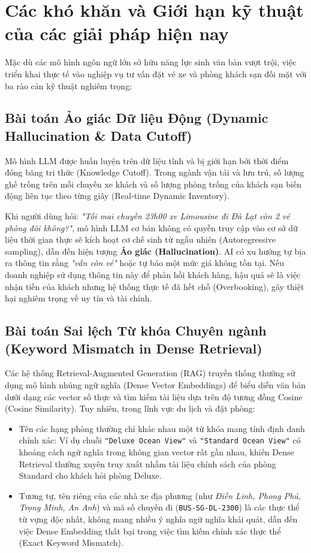 \section{Các khó khăn và Giới hạn kỹ thuật của các giải pháp hiện nay}

Mặc dù các mô hình ngôn ngữ lớn sở hữu năng lực sinh văn bản vượt trội, việc triển khai thực tế vào nghiệp vụ tư vấn đặt vé xe và phòng khách sạn đối mặt với ba rào cản kỹ thuật nghiêm trọng:

\subsection{Bài toán Ảo giác Dữ liệu Động (Dynamic Hallucination \& Data Cutoff)}
Mô hình LLM được huấn luyện trên dữ liệu tĩnh và bị giới hạn bởi thời điểm đóng băng tri thức (Knowledge Cutoff). Trong ngành vận tải và lưu trú, số lượng ghế trống trên mỗi chuyến xe khách và số lượng phòng trống của khách sạn biến động liên tục theo từng giây (Real-time Dynamic Inventory). 

Khi người dùng hỏi: \textit{"Tối mai chuyến 23h00 xe Limousine đi Đà Lạt còn 2 vé phòng đôi không?"}, mô hình LLM cơ bản không có quyền truy cập vào cơ sở dữ liệu thời gian thực sẽ kích hoạt cơ chế sinh từ ngẫu nhiên (Autoregressive sampling), dẫn đến hiện tượng \textbf{Ảo giác (Hallucination)}. AI có xu hướng tự bịa ra thông tin rằng \textit{"vẫn còn vé"} hoặc tự báo một mức giá không tồn tại. Nếu doanh nghiệp sử dụng thông tin này để phản hồi khách hàng, hậu quả sẽ là việc nhận tiền của khách nhưng hệ thống thực tế đã hết chỗ (Overbooking), gây thiệt hại nghiêm trọng về uy tín và tài chính.

\subsection{Bài toán Sai lệch Từ khóa Chuyên ngành (Keyword Mismatch in Dense Retrieval)}
Các hệ thống Retrieval-Augmented Generation (RAG) truyền thống thường sử dụng mô hình nhúng ngữ nghĩa (Dense Vector Embeddings) để biểu diễn văn bản dưới dạng các vector số thực và tìm kiếm tài liệu dựa trên độ tương đồng Cosine (Cosine Similarity). Tuy nhiên, trong lĩnh vực du lịch và đặt phòng:
\begin{itemize}
    \item Tên các hạng phòng thường chỉ khác nhau một từ khóa mang tính định danh chính xác: Ví dụ chuỗi \texttt{"Deluxe Ocean View"} và \texttt{"Standard Ocean View"} có khoảng cách ngữ nghĩa trong không gian vector rất gần nhau, khiến Dense Retrieval thường xuyên truy xuất nhầm tài liệu chính sách của phòng Standard cho khách hỏi phòng Deluxe.
    \item Tương tự, tên riêng của các nhà xe địa phương (như \textit{Điền Linh, Phong Phú, Trọng Minh, An Anh}) và mã số chuyến đi (\texttt{BUS-SG-DL-2300}) là các thực thể từ vựng độc nhất, không mang nhiều ý nghĩa ngữ nghĩa khái quát, dẫn đến việc Dense Embedding thất bại trong việc tìm kiếm chính xác thực thể (Exact Keyword Mismatch).
\end{itemize}

